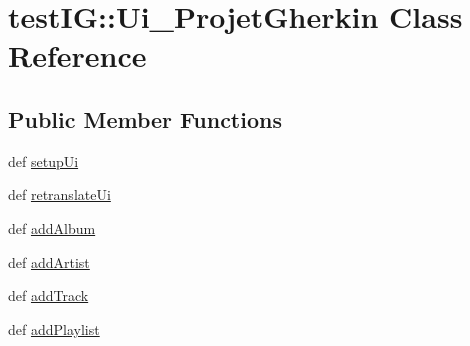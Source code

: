 \hypertarget{classtestIG_1_1Ui__ProjetGherkin}{
\section{testIG::Ui\_\-ProjetGherkin Class Reference}
\label{classtestIG_1_1Ui__ProjetGherkin}
}
\subsection*{Public Member Functions}
\begin{DoxyCompactItemize}
\item 
def \hyperlink{classtestIG_1_1Ui__ProjetGherkin_a88cca1e891634c9d1932a859ecb1082b}{setupUi}
\item 
def \hyperlink{classtestIG_1_1Ui__ProjetGherkin_a4c06c44de39195314869a5e2a641e406}{retranslateUi}
\item 
def \hyperlink{classtestIG_1_1Ui__ProjetGherkin_a35e955bbe69b2c12b7984e2b51d0a1fe}{addAlbum}
\item 
def \hyperlink{classtestIG_1_1Ui__ProjetGherkin_a05175a173aec9a5fe1aeecfd4a5e05e9}{addArtist}
\item 
def \hyperlink{classtestIG_1_1Ui__ProjetGherkin_af27ec0e69fef0b1fecf42e95a005afbc}{addTrack}
\item 
def \hyperlink{classtestIG_1_1Ui__ProjetGherkin_af4731d611cab54e5e94023562c76cd51}{addPlaylist}
\end{DoxyCompactItemize}
